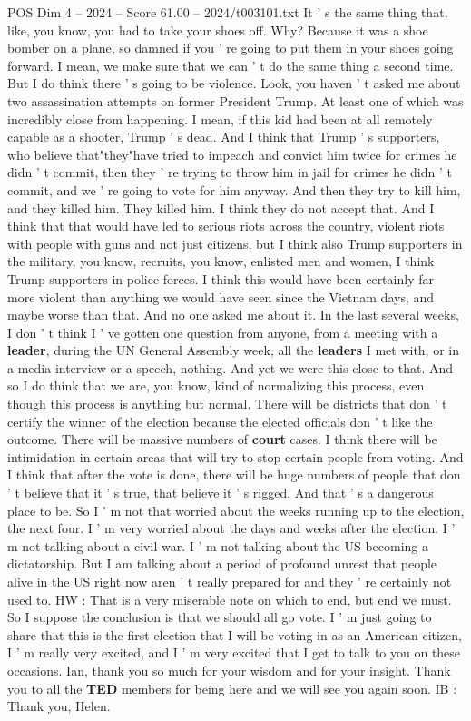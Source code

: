 \begin{textsample}{POS Dim 4 – 2024 – Score 61.00 – 2024/t003101.txt}
It ' s the same thing that, like, you know, you had to take your shoes off.
Why?
Because it was a shoe bomber on a plane, so damned if you ' re going to put them in your shoes going forward.
I mean, we make sure that we can ' t do the same thing a second time.
But I do think there ' s going to be violence.
Look, you haven ' t asked me about two assassination attempts on former President Trump.
At least one of which was incredibly close from happening.
I mean, if this kid had been at all remotely capable as a shooter, Trump ' s dead.
And I think that Trump ' s supporters, who believe that"they"have tried to impeach and convict him twice for crimes he didn ' t commit, then they ' re trying to throw him in jail for crimes he didn ' t commit, and we ' re going to vote for him anyway.
And then they try to kill him, and they killed him.
They killed him.
I think they do not accept that.
And I think that that would have led to serious riots across the country, violent riots with people with guns and not just citizens, but I think also Trump supporters in the military, you know, recruits, you know, enlisted men and women, I think Trump supporters in police forces.
I think this would have been certainly far more violent than anything we would have seen since the Vietnam days, and maybe worse than that.
And no one asked me about it.
In the last several weeks, I don ' t think I ' ve gotten one question from anyone, from a meeting with a \textbf{leader}, during the UN General Assembly week, all the \textbf{leaders} I met with, or in a media interview or a speech, nothing.
And yet we were this close to that.
And so I do think that we are, you know, kind of normalizing this process, even though this process is anything but normal.
There will be districts that don ' t certify the winner of the election because the elected officials don ' t like the outcome.
There will be massive numbers of \textbf{court} cases.
I think there will be intimidation in certain areas that will try to stop certain people from voting.
And I think that after the vote is done, there will be huge numbers of people that don ' t believe that it ' s true, that believe it ' s rigged.
And that ' s a dangerous place to be.
So I ' m not that worried about the weeks running up to the election, the next four.
I ' m very worried about the days and weeks after the election.
I ' m not talking about a civil war.
I ' m not talking about the US becoming a dictatorship.
But I am talking about a period of profound unrest that people alive in the US right now aren ' t really prepared for and they ' re certainly not used to.
HW : That is a very miserable note on which to end, but end we must.
So I suppose the conclusion is that we should all go vote.
I ' m just going to share that this is the first election that I will be voting in as an American citizen, I ' m really very excited, and I ' m very excited that I get to talk to you on these occasions.
Ian, thank you so much for your wisdom and for your insight.
Thank you to all the \textbf{TED} members for being here and we will see you again soon.
IB : Thank you, Helen.


\end{textsample}
